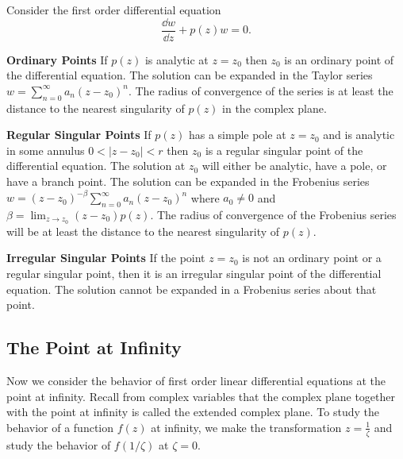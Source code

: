 \begin{Result}
  Consider the first order differential equation
  \[ 
  \frac{\dd w}{\dd z} + p(z) w = 0.
  \]
  \begin{description}
  \item{\textbf{Ordinary Points}}  If $p(z)$ is analytic at $z=z_0$ then
    $z_0$ is an ordinary point of the differential equation.  The solution can be 
    expanded in the Taylor series $w = \sum_{n=0}^\infty a_n (z-z_0)^n$.  The
    radius of convergence of the series is at least the distance to the nearest
    singularity of $p(z)$ in the complex plane.
  \item{\textbf{Regular Singular Points}} If $p(z)$ has a simple pole at 
    $z = z_0$ and is analytic in some annulus $0 < |z-z_0| < r$ then $z_0$
    is a regular singular point of the differential equation.  The solution
    at $z_0$ will either be analytic, have a pole, or have a branch point.
    The solution can be expanded in the Frobenius series
    $w = (z-z_0)^{-\beta} \sum_{n=0}^\infty a_n (z-z_0)^n$ where $a_0 \neq 0$
    and $\beta = \lim_{z \to z_0} (z-z_0) p(z)$.  The radius of convergence of the
    Frobenius series will be at least the distance to the nearest singularity
    of $p(z)$.
  \item{\textbf{Irregular Singular Points}} If the point $z=z_0$ is not
    an ordinary point or a regular singular point, then it is an irregular singular
    point of the differential equation.  The solution cannot be expanded in a 
    Frobenius series about that point.
  \end{description}
\end{Result}








\subsection{The Point at Infinity}
\label{fode:section:ecp:sub:pi}


Now we consider the behavior of first order linear differential equations
at the point at infinity.  Recall from complex variables that the 
complex plane together with the point at infinity is called the
extended complex plane.  To study the behavior of a function $f(z)$ at 
infinity, we make the transformation $z = \frac{1}{\zeta}$ and study the 
behavior of $f(1/\zeta)$ at $\zeta=0$.


